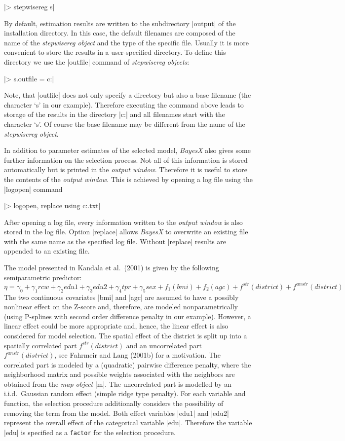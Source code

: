 |> stepwisereg s|

By default, estimation results are written to the subdirectory |output| of the installation directory. In this case, the
default filenames are composed of the name of the {\it stepwisereg object} and the type of the specific file. Usually it is
more convenient to store the results in a user-specified directory. To define this directory we use the |outfile| command of
{\it stepwisereg objects}:

|> s.outfile = c:\data\s|

Note, that |outfile| does not only specify a directory but also a base filename (the character `s' in our example). Therefore
executing the command above leads to storage of the results in the directory |c:\data| and all filenames start with the
character `s'. Of course the base filename may be different from the name of the {\it stepwisereg object}.

In addition to parameter estimates of the selected model, {\it BayesX} also gives some further information on the selection
process. Not all of this information is stored automatically but is printed in the {\it output window}. Therefore it is useful
to store the contents of the {\it output window}. This is achieved by opening a log file using the |logopen|
command

|> logopen, replace using c:\data\logstep.txt|

After opening a log file, every information written to the {\it output window} is also stored in the log file. Option |replace|
allows {\it BayesX} to overwrite an existing file with the same name as the specified log file. Without |replace| results are
appended to an existing file.

The model presented in Kandala et al.~(2001) is given by the following semiparametric predictor:
\[\eta=\gamma_0+\gamma_1rcw+\gamma_2edu1+\gamma_3edu2+\gamma_4tpr+\gamma_5sex+f_1(bmi)+f_2(agc)+f^{str}(district)+f^{unstr}(district)\]
The two continuous covariates |bmi| and |agc| are assumed to have a possibly nonlinear effect on the Z-score and, therefore,
are modeled nonparametrically (using P-splines with second order difference penalty in our example). However, a linear effect
could be more appropriate and, hence, the linear effect is also considered for model selection. The spatial effect of the
district is split up into a spatially correlated part $f^{str}(district)$ and an uncorrelated part $f^{unstr}(district)$, see
Fahrmeir and Lang (2001b) for a motivation. The correlated part is modeled by a (quadratic) pairwise difference penalty, where the
neighborhood matrix and possible weights associated with the neighbors are obtained from the {\it map object} |m|. The
uncorrelated part is modelled by an i.i.d.~Gaussian random effect (simple ridge type penalty). For each variable and function,
the selection procedure additionally considers the possibility of removing the term from the model.
Both effect variables |edu1| and |edu2| represent
the overall effect of the categorical variable |edu|.  Therefore the variable
|edu| is specified as a {\tt factor} for the selection procedure.


